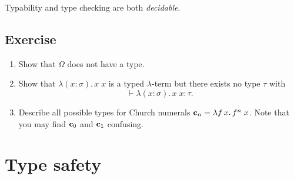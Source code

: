 \begin{theorem}
  Typability and type checking are both \emph{decidable}.
\end{theorem}

\subsection*{Exercise}
\begin{enumerate}
  \item Show that $\Omega$ does not have a type.
  \item Show that $\lambda (x : \sigma).\, x\; x$ is a typed $\lambda$-term but
    there exists no type $\tau$ with 
    \[
      \vdash \lambda (x : \sigma).\, x\; x : \tau.
    \]
  \item Describe all possible types for Church numerals $\mathbf{c}_{n} = \lambda
    f\,x.\, f^n\;x$. Note that you may find $\mathbf{c}_{0}$ and $\mathbf{c}_{1}$ confusing.
  \end{enumerate}
\section{Type safety}
